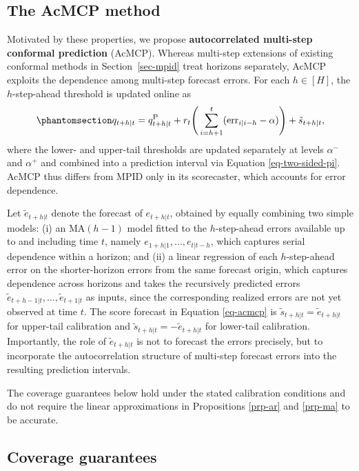 \documentclass[
  american,
  12pt]{article}
\theoremstyle{plain}
\theoremstyle{plain}
\theoremstyle{remark}
\begin{document}
\subsection{The AcMCP method}\label{sec-novel}

Motivated by these properties, we propose \textbf{autocorrelated
multi-step conformal prediction} (AcMCP). Whereas multi-step extensions
of existing conformal methods in Section~\ref{sec-mpid} treat horizons
separately, AcMCP exploits the dependence among multi-step forecast
errors. For each \(h\in[H]\), the \(h\)-step-ahead threshold is updated
online as \begin{equation}\phantomsection\label{eq-acmcp}{
q_{t+h|t}=q^{\mathrm P}_{t+h|t}+r_t\Bigg(\sum_{i=h+1}^t(\mathrm{err}_{i|i-h}-\alpha)\Bigg)+\tilde{s}_{t+h|t},
}\end{equation} where the lower- and upper-tail thresholds are updated
separately at levels \(\alpha^{-}\) and \(\alpha^{+}\) and combined into
a prediction interval via Equation \eqref{eq-two-sided-pi}. AcMCP thus
differs from MPID only in its scorecaster, which accounts for error
dependence.

Let \(\tilde e_{t+h|t}\) denote the forecast of \(e_{t+h|t}\), obtained
by equally combining two simple models: (i) an MA\((h-1)\) model fitted
to the \(h\)-step-ahead errors available up to and including time \(t\),
namely \(e_{1+h|1},\dots,e_{t|t-h}\), which captures serial dependence
within a horizon; and (ii) a linear regression of each \(h\)-step-ahead
error on the shorter-horizon errors from the same forecast origin, which
captures dependence across horizons and takes the recursively predicted
errors \(\tilde e_{t+h-1|t},\dots,\tilde e_{t+1|t}\) as inputs, since
the corresponding realized errors are not yet observed at time \(t\).
The score forecast in Equation \eqref{eq-acmcp} is
\(\tilde s_{t+h|t}=\tilde e_{t+h|t}\) for upper-tail calibration and
\(\tilde s_{t+h|t}=-\tilde e_{t+h|t}\) for lower-tail calibration.
Importantly, the role of \(\tilde e_{t+h|t}\) is not to forecast the
errors precisely, but to incorporate the autocorrelation structure of
multi-step forecast errors into the resulting prediction intervals.

The coverage guarantees below hold under the stated calibration
conditions and do not require the linear approximations in Propositions
\ref{prp-ar} and \ref{prp-ma} to be accurate.

\subsection{Coverage guarantees}\label{sec-cov}
\end{document}
